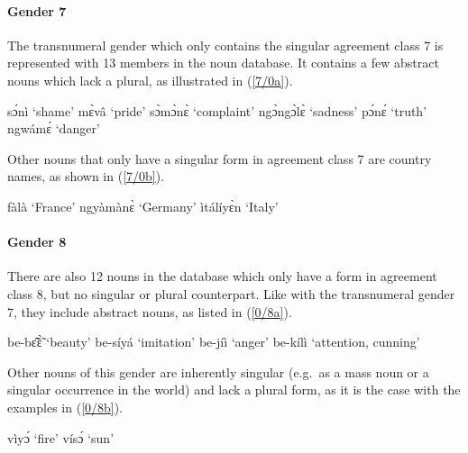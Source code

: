 \paragraph{Gender 7}
The transnumeral gender which only contains the singular agreement class 7 is represented with 13 members in the noun database. It contains a few abstract nouns which lack a plural, as illustrated in (\ref{7/0a}).

\begin{exe}
\ex\label{7/0a}
\begin{xlist}
\ex sɔ́nì `shame'
\ex mɛ̀vâ `pride'
\ex sɔ̀mɔ̀nɛ̀ `complaint'
\ex ngɔ̀ngɔ̀lɛ̀ `sadness'
\ex pɔ́nɛ́ `truth'
\ex ngwámɛ́ `danger'
\end{xlist}
\end{exe}

\noindent Other nouns that only have a singular form in agreement class 7 are country names, as shown in (\ref{7/0b}). 

\begin{exe}
\ex\label{7/0b}
\begin{xlist}
\ex fàlà `France'
\ex ngyàmànɛ̀ `Germany'
\ex ìtálíyɛ̀n `Italy'
\end{xlist}
\end{exe}



\paragraph{Gender 8}
There are also 12 nouns in the database which only have a form in agreement class 8, but no singular or plural counterpart. Like with the transnumeral gender 7, they include abstract nouns, as listed in (\ref{0/8a}). 


\begin{exe}
\ex\label{0/8a}
\begin{xlist}
\ex be-bɛ̃̂ɛ̃̀ `beauty'
\ex be-síyá `imitation'
\ex be-jíì `anger'
\ex be-kílì  `attention, cunning'
\end{xlist}
\end{exe}

\noindent Other nouns of this gender are inherently singular (e.g.\ as a mass noun or a singular occurrence in the world) and lack a plural form, as it is the case with the examples in (\ref{0/8b}).

\begin{exe}
\ex\label{0/8b}
\begin{xlist}
\ex vìyɔ́ `fire'
\ex vísɔ́ `sun'
\end{xlist}
\end{exe}



